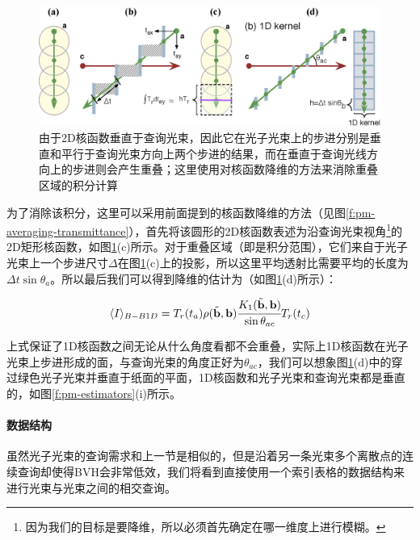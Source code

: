 \begin{figure}
\begin{fullwidth}
	\includegraphics[width=\thewidth]{figures/pm/bb1d}
	\caption{由于2D核函数垂直于查询光束，因此它在光子光束上的步进分别是垂直和平行于查询光束方向上两个步进的结果，而在垂直于查询光线方向上的步进则会产生重叠；这里使用对核函数降维的方法来消除重叠区域的积分计算}
	\label{f:pm-bb1d}
\end{fullwidth}
\end{figure}

为了消除该积分，这里可以采用前面提到的核函数降维的方法（见图\ref{f:pm-averaging-transmittance}），首先将该圆形的2D核函数表述为沿查询光束视角\footnote{因为我们的目标是要降维，所以必须首先确定在哪一维度上进行模糊。}的2D矩形核函数，如图\ref{f:pm-bb1d}(c)所示。对于重叠区域（即是积分范围），它们来自于光子光束上一个步进尺寸$\Delta$在图\ref{f:pm-bb1d}(c)上的投影，所以这里平均透射比需要平均的长度为$\Delta t\sin{\theta_a}$。所以最后我们可以得到降维的估计为（如图\ref{f:pm-bb1d}(d)所示）：

\begin{equation}\label{e:pm-bb1d}
	\langle I\rangle_{B-B1D}=T_r(t_a) \rho(\tilde{\mathbf{b}},\mathbf{b}) \cfrac{K_1(\tilde{\mathbf{b}},\mathbf{b})}{\sin{\theta_{ac}}}T_r(t_c)
\end{equation}

上式保证了1D核函数之间无论从什么角度看都不会重叠，实际上1D核函数在光子光束上步进形成的面，与查询光束的角度正好为$\theta_{ac}$，我们可以想象图\ref{f:pm-bb1d}(d)中的穿过绿色光子光束并垂直于纸面的平面，1D核函数和光子光束和查询光束都是垂直的，如图\ref{f:pm-estimators}(i)所示。




\paragraph{数据结构}
虽然光子光束的查询需求和上一节是相似的，但是沿着另一条光束多个离散点的连续查询却使得BVH会非常低效，我们将看到\cite{a:UnifyingPointsBeamsandPathsinVolumetricLightTransportSimulation}直接使用一个索引表格的数据结构来进行光束与光束之间的相交查询。






